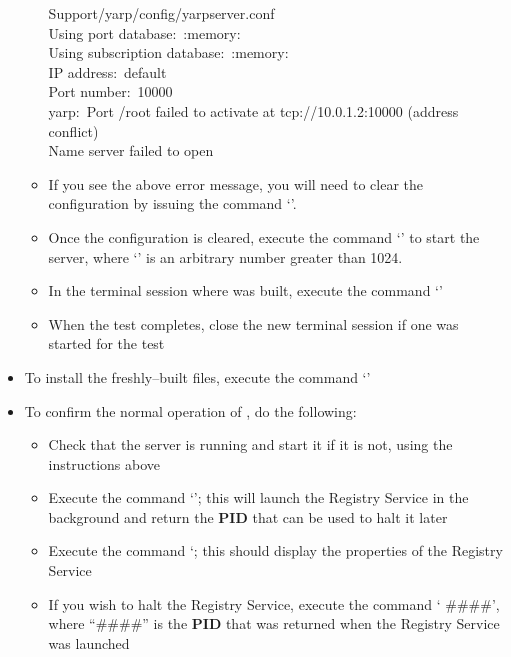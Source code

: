 \begin{itemize}
\begin{itemize}
\hspace*{5em}Support/yarp/config/yarpserver.conf\\
Using port database:\ :memory:\\
Using subscription database:\ :memory:\\
IP address:\ default\\
Port number:\ 10000\\
yarp:\ Port /root failed to activate at tcp://10.0.1.2:10000 (address conflict)\\
Name server failed to open
\outputEnd{}
\item If you see the above error message, you will need to clear the \yarp{}
configuration by issuing the command `'.
\item Once the \yarp{} configuration is cleared, execute the command
`' to start the \yarp{} server, where
`' is an arbitrary number greater than 1024.
\item In the terminal session where \mplusm{} was built, execute the command
`'
\item When the test completes, close the new terminal session if one was started for the
test
\end{itemize}
\item To install the freshly--built \mplusm{} files, execute the command
`'
\item To confirm the normal operation of \mplusm{}, do the following:
\begin{itemize}
\item Check that the \yarp{} server is running and start it if it is not, using the
instructions above
\item Execute the command `'; this will launch the Registry
Service in the background and return the \textbf{PID} that can be used to halt it later
\item Execute the command `; this should display the properties
of the Registry Service
\item If you wish to halt the Registry Service, execute the command `
\#\#\#\#', where ``\#\#\#\#'' is the \textbf{PID} that was returned when the Registry
Service was launched
\end{itemize}
\end{itemize}
\tertiaryEnd{}
\TBD{}
\tertiaryEnd{}
